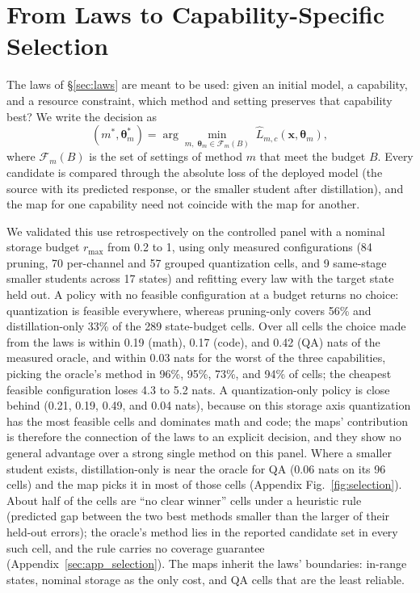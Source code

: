 \section{From Laws to Capability-Specific Selection}
\label{sec:selection}


The laws of \S\ref{sec:laws} are meant to be used: given an initial
model, a capability, and a resource constraint, which method and
setting preserves that capability best? We write the decision as
\begin{equation}
(m^{*},\boldsymbol\theta_m^{*})=\arg\min_{m,\;\boldsymbol\theta_m\in\mathcal F_m(B)}\;
\widehat L_{m,c}(\mathbf x,\boldsymbol\theta_m),
\label{eq:selection}
\end{equation}
where $\mathcal F_m(B)$ is the set of settings of method $m$ that meet
the budget $B$. Every candidate is compared through the absolute loss of the deployed
model (the source with its predicted response, or the smaller student
after distillation), and the map for one capability need not coincide
with the map for another.

We validated this use retrospectively on the controlled panel with a
nominal storage budget $r_{\max}$ from 0.2 to 1, using only measured
configurations (84 pruning, 70 per-channel and 57 grouped quantization
cells, and 9 same-stage smaller students across 17 states) and
refitting every law with the target state held out. A policy with no
feasible configuration at a budget returns no choice: quantization is
feasible everywhere, whereas pruning-only covers 56\% and
distillation-only 33\% of the 289 state-budget cells. Over all cells
the choice made from the laws is within 0.19 (math), 0.17 (code), and
0.42 (QA) nats of the measured oracle, and within 0.03 nats for the
worst of the three capabilities, picking the oracle's method in
96\%, 95\%, 73\%, and 94\% of cells; the cheapest feasible
configuration loses 4.3 to 5.2 nats. A quantization-only policy is
close behind (0.21, 0.19, 0.49, and 0.04 nats), because on this
storage axis quantization has the most feasible cells and dominates
math and code; the maps' contribution is therefore the connection of
the laws to an explicit decision, and they show no general advantage
over a strong single method on this panel. Where a smaller student
exists, distillation-only is near the oracle for QA (0.06 nats on its
96 cells) and the map picks it in most of those cells (Appendix
Fig.~\ref{fig:selection}). About half of the cells are ``no clear
winner'' cells under a heuristic rule (predicted gap between the two
best methods smaller than the larger of their held-out errors); the
oracle's method lies in the reported candidate set in every such
cell, and the rule carries no coverage guarantee
(Appendix~\ref{sec:app_selection}). The maps inherit the laws'
boundaries: in-range states, nominal storage as the only cost, and QA
cells that are the least reliable.
